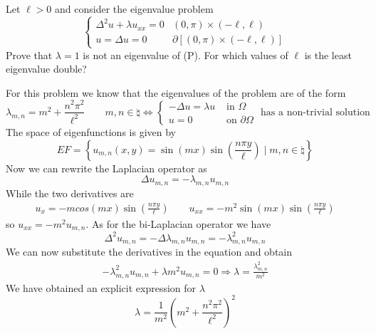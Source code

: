 \newpage
\begin{exercise}
    Let \(\ell > 0\) and consider the eigenvalue problem
    \[
        \begin{cases}
            \Delta^2 u + \lambda u_{xx} = 0 & (0, \pi) \times (-\ell, \ell) \\
            u =  \Delta u = 0 & \partial\left[(0, \pi) \times (-\ell, \ell)\right]
        \end{cases}
        \tag*{(P)}
    \]
    Prove that \(\lambda = 1\) is not an eigenvalue of (P). For which values of \(\ell\) is the least eigenvalue double?
\end{exercise}

For this problem we know that the eigenvalues of the problem are of the form
\[
    \lambda_{m,n} = m^2 +  \frac{n^2 \pi^2}{\ell^2} \qquad m, n \in \natural \iff \begin{cases}
        -\Delta u = \lambda u & \text{ in } \Omega \\
        u = 0 & \text{ on } \partial\Omega
    \end{cases} \text{ has a non-trivial solution}
\]
The space of eigenfunctions is given by
\[
    EF = \left\{ u_{m,n}(x, y) = \sin(mx) \sin\left(\frac{n \pi y}{\ell}\right) \mid m, n \in \natural \right\}
\]
Now we can rewrite the Laplacian operator as
\[
    \Delta u_{m,n} = - \lambda_{m,n} u_{m,n} 
\]
While the two derivatives are
\[
    \begin{split}
        u_x = -m cos(mx) \sin\left(\frac{n \pi y}{\ell}\right) \qquad u_{xx} = -m^2 \sin(mx) \sin\left(\frac{n \pi y}{\ell}\right) 
    \end{split}
\]
so \(u_{xx} = -m^2 u_{m,n}\). As for the bi-Laplacian operator we have
\[
    \Delta^2 u_{m,n} = - \Delta \lambda_{m,n} u_{m,n} = - \lambda_{m,n}^2 u_{m,n}
\]
We can now substitute the derivatives in the equation and obtain
\[
    \begin{split}
        - \lambda_{m,n}^2 u_{m,n} + \lambda m^2 u_{m,n} = 0 \Rightarrow \lambda = \frac{\lambda_{m,n}^2}{m^2}
    \end{split}
\]
We have obtained an explicit expression for \(\lambda\)
\[
    \lambda = \frac{1}{m^2} \left(m^2 + \frac{n^2 \pi^2}{\ell^2}\right)^2
\] 
